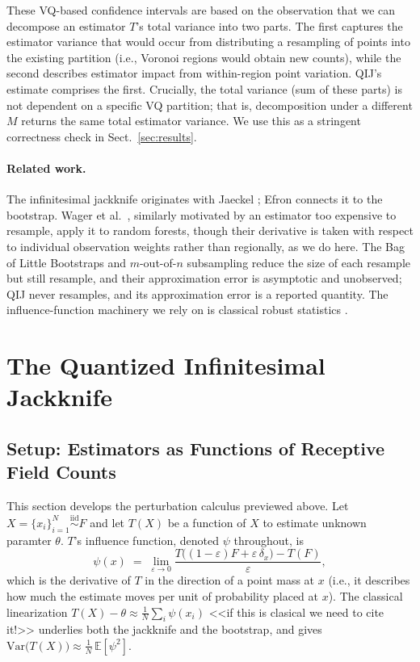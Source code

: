 \documentclass[runningheads]{llncs}
\newcommand{\ifl}{\psi}
\begin{document}
These VQ-based confidence intervals are based on the observation that we can decompose an estimator $T$'s total variance into two parts. The first captures the estimator variance that would occur from distributing a resampling of points into the existing partition (i.e., Voronoi regions would obtain new counts), while the second describes estimator impact from within-region point variation. QIJ's estimate comprises the first. Crucially, the total variance (sum of these parts) is not dependent on a specific VQ partition; that is, decomposition under a different $M$ returns the same total estimator variance. We use this as a stringent correctness check in Sect.~\ref{sec:results}.

\paragraph{Related work.} The infinitesimal jackknife originates with Jaeckel \cite{jaeckel1972}; Efron \cite{efron1982} connects it to the bootstrap. Wager et al.\ \cite{wager2014}, similarly motivated by an estimator too expensive to resample, apply it to random forests, though their derivative is taken with respect to individual observation weights rather than regionally, as we do here. The Bag of Little Bootstraps \cite{kleiner2014} and $m$-out-of-$n$ subsampling \cite{bickel1997} reduce the size of each resample but still resample, and their approximation error is asymptotic and unobserved; QIJ never resamples, and its approximation error is a reported quantity. The influence-function machinery we rely on is classical robust statistics \cite{hampel1974,stefanski2002}.


\section{The Quantized Infinitesimal Jackknife}\label{sec:method}

\subsection{Setup: Estimators as Functions of Receptive Field Counts}\label{sec:setup}

This section develops the perturbation calculus previewed above. Let $X = \{x_i\}_{i=1}^N \stackrel{\mathrm{iid}}{\sim} F$ and let $T(X)$ be a function of $X$ to estimate unknown paramter $\theta$. $T$'s influence function, denoted $\ifl$ throughout, is
\begin{equation}
\ifl(x) \;=\; \lim_{\varepsilon \to 0}\frac{T\bigl((1-\varepsilon)F + \varepsilon\,\delta_x\bigr) - T(F)}{\varepsilon},
\end{equation}
which is the derivative of $T$ in the direction of a point mass at $x$ (i.e., it describes how much the estimate moves per unit of probability placed at $x$). The classical linearization $T(X) - \theta \approx \tfrac1N\sum_i \ifl(x_i)$ <<if this is clasical we need to cite it!>> underlies both the jackknife and the bootstrap, and gives $\mathrm{Var}\bigl(T(X)\bigr) \approx \tfrac1N\,\mathbb{E}[\ifl^2]$.
\end{document}
